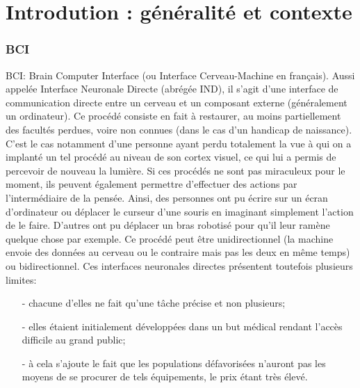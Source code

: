 \part{Introdution : généralité et contexte} %
\label{prt:introduction_ _théorique_}
	
	\section{BCI} %
	\label{sec:intro_bci}
	
	BCI: Brain Computer Interface (ou Interface Cerveau-Machine en français).
	Aussi appelée Interface Neuronale Directe (abrégée IND), il s'agit d'une interface de communication directe entre un cerveau et un composant externe (généralement un ordinateur).
	Ce procédé consiste en fait à restaurer, au moins partiellement des facultés perdues, voire non connues (dans le cas d'un handicap de naissance). C'est le cas notamment d'une personne ayant perdu totalement la vue à qui on a implanté un tel procédé au niveau de son cortex visuel, ce qui lui a permis de percevoir de nouveau la lumière. Si ces procédés ne sont pas miraculeux pour le moment, ils peuvent également permettre d'effectuer des actions par l'intermédiaire de la pensée. Ainsi, des personnes ont pu écrire sur un écran d'ordinateur ou déplacer le curseur d'une souris en imaginant simplement l'action de le faire. D'autres ont pu déplacer un bras robotisé pour qu'il leur ramène quelque chose par exemple.
	Ce procédé peut être unidirectionnel (la machine envoie des données au cerveau ou le contraire mais pas les deux en même temps) ou bidirectionnel.
	Ces interfaces neuronales directes présentent toutefois plusieurs limites:
	\begin{itemize}
		\item [-] chacune d'elles ne fait qu'une tâche précise et non plusieurs;
		\item [-] elles étaient initialement développées dans un but médical rendant l'accès difficile au grand public;
		\item [-] à cela s'ajoute le fait que les populations défavorisées n'auront pas les moyens de se procurer de tels équipements, le prix étant très élevé.
	\end{itemize}

	
